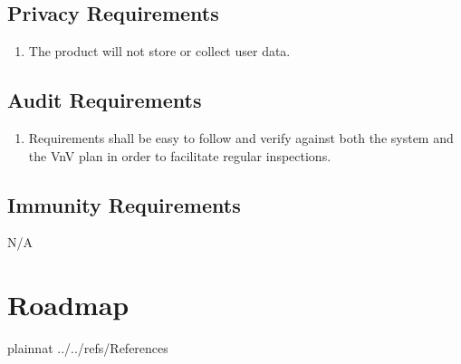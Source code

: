 \documentclass{article}
\begin{document}
\subsection{Privacy Requirements}
\begin{enumerate}[{SR}1., leftmargin=2\parindent, resume]
    \item The product will not store or collect user data.
\end{enumerate}

\subsection{Audit Requirements}
\begin{enumerate}[{SR}1., leftmargin=2\parindent, resume]
    \item Requirements shall be easy to follow and verify against both the system and the VnV plan in order to facilitate regular inspections.
\end{enumerate}

\subsection{Immunity Requirements}
N/A

\section{Roadmap}

\newpage

 {plainnat}
 {../../refs/References}
\end{document}
